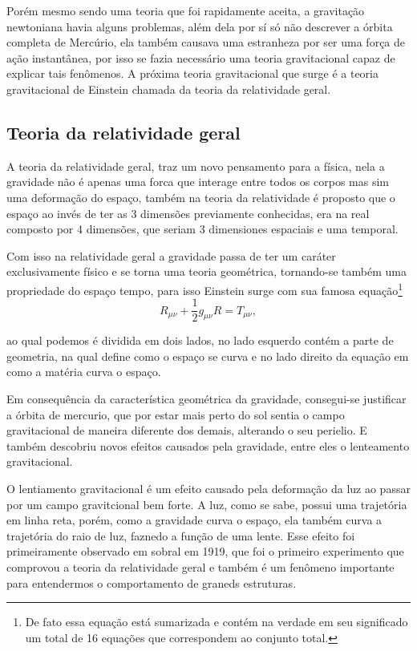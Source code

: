 \documentclass[
	article,			%
	11pt,				%
	twoside,			%
	a4paper,			%
	english,			%
	brazil,				%
	sumario=tradicional
	]{abntex2}
\begin{document}
Porém mesmo sendo uma teoria que foi rapidamente aceita, a gravitação newtoniana havia alguns problemas, além dela por sí só não descrever a órbita completa de Mercúrio, ela também causava uma estranheza por ser uma força de ação instantânea, por isso se fazia necessário uma teoria gravitacional capaz de explicar tais fenômenos. A próxima teoria gravitacional que surge é a teoria gravitacional de Einstein chamada da teoria da relatividade geral.
\subsection{Teoria da relatividade geral}

A teoria da relatividade geral, traz um novo pensamento para a  física, nela a gravidade não é apenas uma forca que interage entre todos os corpos mas sim uma deformação do espaço, também na teoria da relatividade é proposto que o espaço ao invés de ter as 3 dimensões previamente conhecidas, era na real composto por 4 dimensões, que seriam 3 dimensiones espaciais e uma temporal.

Com isso na relatividade geral a gravidade passa de ter um caráter exclusivamente físico e se torna uma teoria geométrica, tornando-se também uma propriedade do espaço tempo, para isso Einstein surge com sua famosa equação\footnote{De fato essa equação está sumarizada e contém na verdade em seu significado um total de 16 equações que correspondem  ao conjunto total.}
\begin{equation}
	R_{\mu \nu}+\frac{1}{2}g_{\mu \nu} R = T_{\mu \nu},
\end{equation}

ao qual podemos é dividida em dois lados, no lado esquerdo contém a parte de geometria, na qual define como o espaço se curva e no lado direito da equação em como a matéria curva o espaço.

Em consequência da característica geométrica da gravidade, consegui-se justificar a órbita de mercurio, que por estar mais perto do sol sentia o campo gravitacional de maneira diferente dos demais, alterando o seu perielio. E também descobriu novos efeitos causados pela gravidade, entre eles o lenteamento gravitacional.

O lentiamento gravitacional é um efeito causado pela deformação da luz ao passar por um campo gravitcional bem forte. A luz, como se sabe, possui uma trajetória em linha reta, porém, como a gravidade curva o espaço, ela também curva a trajetória do raio de luz, faznedo a função de uma lente. Esse efeito foi primeiramente observado em sobral em 1919, que foi o primeiro experimento que comprovou a teoria da relatividade geral e também é um fenômeno importante para entendermos o comportamento de graneds estruturas.
\end{document}
